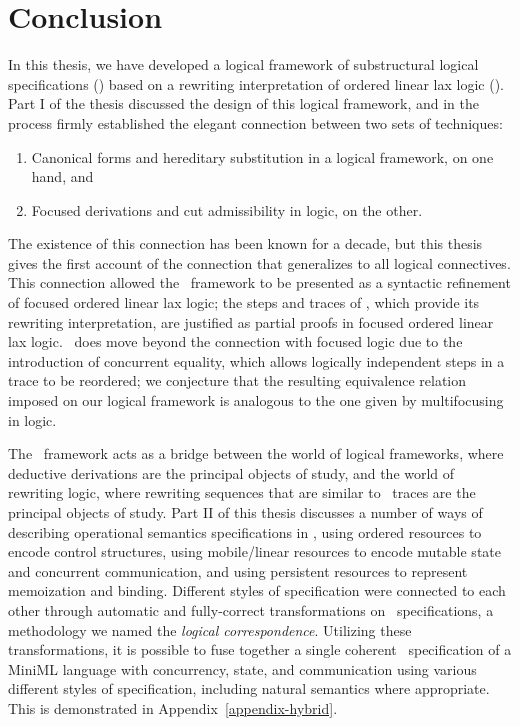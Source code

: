 \chapter{Conclusion}
\label{chapter-conclusion}

In this thesis, we have developed a logical framework of substructural
logical specifications (\sls) based on a rewriting interpretation of
ordered linear lax logic (\ollll). Part I of the thesis discussed the
design of this logical framework, and in the process firmly
established the elegant connection between two sets of techniques:

\smallskip
\begin{enumerate}
\item Canonical forms and hereditary
substitution in a logical framework, on one hand, and 
\item Focused derivations and cut
admissibility in logic, on the other.
\end{enumerate}

\smallskip
\noindent 
The existence of this connection has been known for a decade, but this
thesis gives the first account of the connection that generalizes to
all logical connectives. This connection allowed the \sls~framework to
be presented as a syntactic refinement of focused ordered linear lax
logic; the steps and traces of \sls, which provide its rewriting
interpretation, are justified as partial proofs in focused ordered
linear lax logic. \sls~does move beyond the connection with focused
logic due to the introduction of concurrent equality, which allows
logically independent steps in a trace to be reordered; we conjecture
that the resulting equivalence relation imposed on our logical
framework is analogous to the one given by multifocusing in logic.

The \sls~framework acts as a bridge between the world of logical
frameworks, where deductive derivations are the principal objects of
study, and the world of rewriting logic, where rewriting sequences
that are similar to \sls~traces are the principal objects of
study. Part II of this thesis discusses a number of ways of describing
operational semantics specifications in \sls, using ordered resources
to encode control structures, using mobile/linear resources to encode
mutable state and concurrent communication, and using persistent
resources to represent memoization and binding. Different styles of
specification were connected to each other through automatic and
fully-correct transformations on \sls~specifications, a methodology we
named the {\it logical correspondence}. Utilizing these
transformations, it is possible to fuse together a single coherent
\sls~specification of a MiniML language with concurrency, state, and
communication using various different styles of specification,
including natural semantics where appropriate. This is demonstrated in
Appendix~\ref{appendix-hybrid}.


